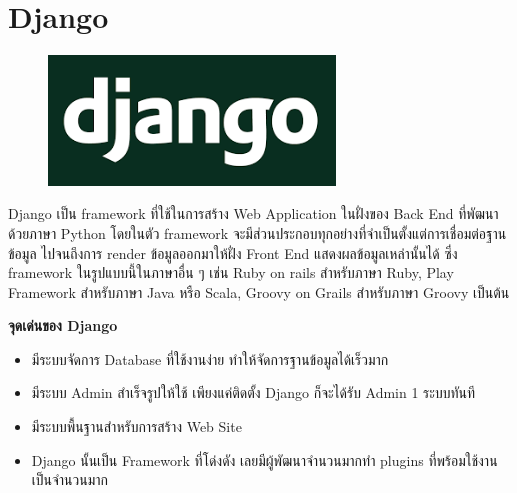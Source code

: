 \section{Django}
\label{Django}
\begin{figure}[!thb]
	\captionsetup{justification=centering}
	\centering
	\includegraphics[width=3in]{figures/django.png}
	\label{fig:django}
\end{figure}
Django เป็น framework ที่ใช้ในการสร้าง Web Application ในฝั่งของ Back End ที่พัฒนาด้วยภาษา Python โดยในตัว framework จะมีส่วนประกอบทุกอย่างที่จำเป็นตั้งแต่การเชื่อมต่อฐานข้อมูล ไปจนถึงการ render ข้อมูลออกมาให้ฝั่ง Front End แสดงผลข้อมูลเหล่านั้นได้ ซึ่ง framework ในรูปแบบนี้ในภาษาอื่น ๆ เช่น Ruby on rails สำหรับภาษา Ruby, Play Framework สำหรับภาษา Java หรือ Scala, Groovy on Grails สำหรับภาษา Groovy เป็นต้น

\begin{flushleft}
	\textbf{จุดเด่นของ Django}
\end{flushleft}
\begin{itemize}
	\item มีระบบจัดการ Database ที่ใช้งานง่าย ทำให้จัดการฐานข้อมูลได้เร็วมาก
	\item มีระบบ Admin สำเร็จรูปให้ใช้ เพียงแค่ติดตั้ง Django ก็จะได้รับ Admin 1 ระบบทันที
	\item มีระบบพื้นฐานสำหรับการสร้าง Web Site
	\item Django นั้นเป็น Framework ที่โด่งดัง เลยมีผู้พัฒนาจำนวนมากทำ plugins ที่พร้อมใช้งานเป็นจำนวนมาก
\end{itemize}

